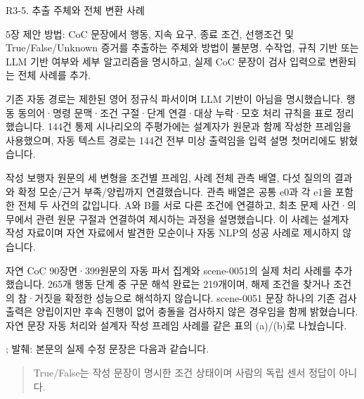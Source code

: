 \clearpage

\begin{reviewitem}{R3-5. 추출 주체와 전체 변환 사례}

\begin{reviewercomment}

5장 제안 방법: CoC 문장에서 행동, 지속 요구, 종료 조건, 선행조건 및 True/False/Unknown 증거를 추출하는 주체와 방법이 불분명. 수작업, 규칙 기반 또는 LLM 기반 여부와 세부 알고리즘을 명시하고, 실제 CoC 문장이 검사 입력으로 변환되는 전체 사례를 추가.

\end{reviewercomment}

\begin{authorresponse}

기존 자동 경로는 제한된 영어 정규식 파서이며 LLM 기반이 아님을 명시했습니다. 행동 동의어·명령 문맥·조건 구절·단계 연결·대상 누락·모호 처리 규칙을 표로 정리했습니다. 144건 통제 시나리오의 주평가에는 설계자가 원문과 함께 작성한 프레임을 사용했으며, 자동 텍스트 경로는 144건 전부 미상 출력임을 입력 설명 첫머리에도 밝혔습니다.

작성 보행자 원문의 세 변형을 조건별 프레임, 사례 전체 관측 배열, 다섯 질의의 결과와 확정 모순/근거 부족/양립까지 연결했습니다. 관측 배열은 공통 e0과 각 e1을 포함한 전체 두 사건의 값입니다. A와 B를 서로 다른 조건에 연결하고, 최초 문제 사건·의무에서 관련 원문 구절과 연결하여 제시하는 과정을 설명했습니다. 이 사례는 설계자 작성 자료이며 자연 자료에서 발견한 모순이나 자동 NLP의 성공 사례로 제시하지 않습니다.

자연 CoC 90장면·399원문의 자동 파서 집계와 scene-0051의 실제 처리 사례를 추가했습니다. 265개 행동 단계 중 구문 해석 완료는 219개이며, 해제 조건을 찾거나 조건의 참·거짓을 확정한 성능으로 해석하지 않습니다. scene-0051 문장 하나의 기존 검사 출력은 양립이지만 후속 진행이 없어 충돌을 검사하지 않은 경우임을 함께 밝혔습니다. 자연 문장 자동 처리와 설계자 작성 프레임 사례를 같은 표의 (a)/(b)로 나눴습니다.

\end{authorresponse}

\begin{manuscriptrevision}{; 발췌: }
본문의 실제 수정 문장은 다음과 같습니다.

\begin{quote}
True/False는 작성 문장이 명시한 조건 상태이며 사람의 독립 센서 정답이 아니다.
\end{quote}
\end{manuscriptrevision}

\end{reviewitem}

